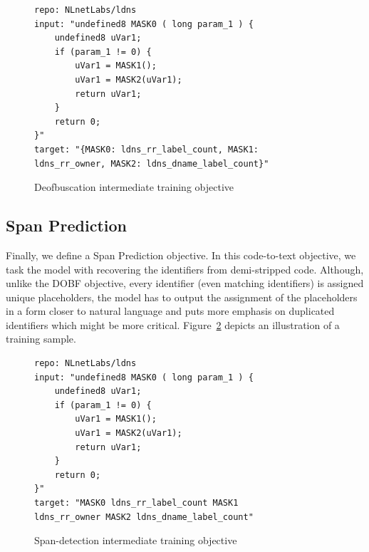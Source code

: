 \begin{figure}[tbh]
  \centering
\begin{verbatim}
repo: NLnetLabs/ldns
input: "undefined8 MASK0 ( long param_1 ) { 
    undefined8 uVar1; 
    if (param_1 != 0) { 
        uVar1 = MASK1(); 
        uVar1 = MASK2(uVar1); 
        return uVar1; 
    } 
    return 0; 
}"
target: "{MASK0: ldns_rr_label_count, MASK1:
ldns_rr_owner, MASK2: ldns_dname_label_count}"
\end{verbatim}
  \caption{Deofbuscation intermediate training objective}
  \label{fig:dobf}
\end{figure}


\subsection{Span Prediction}
Finally, we define a Span Prediction objective. In this code-to-text objective, we task the model with recovering the identifiers from demi-stripped code. Although, unlike the DOBF objective, every identifier (even matching identifiers) is assigned unique placeholders, the model has to output the assignment of the placeholders in a form closer to natural language and puts more emphasis on duplicated identifiers which might be more critical. Figure~\ref{fig:spanDetection} depicts an illustration of a training sample. 

\begin{figure}[tbh]
  \centering
\begin{verbatim}
repo: NLnetLabs/ldns
input: "undefined8 MASK0 ( long param_1 ) { 
    undefined8 uVar1; 
    if (param_1 != 0) { 
        uVar1 = MASK1(); 
        uVar1 = MASK2(uVar1); 
        return uVar1; 
    } 
    return 0; 
}"
target: "MASK0 ldns_rr_label_count MASK1
ldns_rr_owner MASK2 ldns_dname_label_count"
\end{verbatim}
  \caption{Span-detection intermediate training objective}
  \label{fig:spanDetection}
\end{figure}

